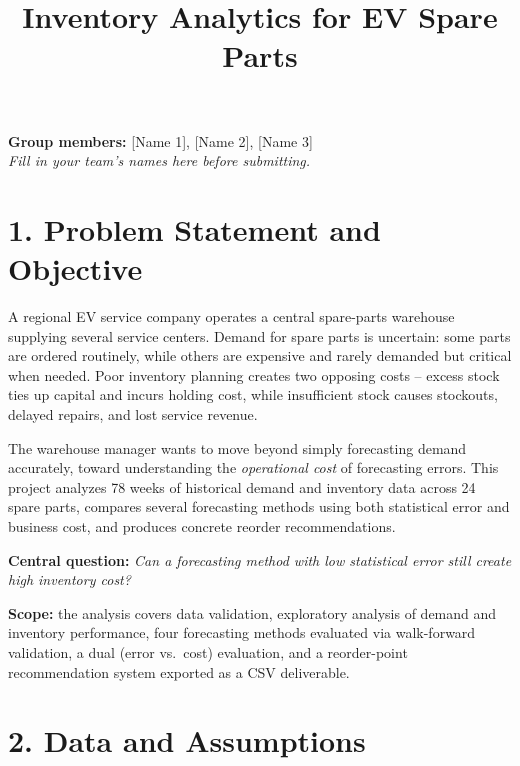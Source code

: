 \documentclass[12pt]{article}
\title{\vspace{-1.5em}Inventory Analytics for EV Spare Parts}
\author{}
\date{}
\begin{document}
\maketitle
\vspace{-2.5em}

\begin{center}
\textbf{Group members:} [Name 1], [Name 2], [Name 3] \\
\textit{Fill in your team's names here before submitting.}
\end{center}

\vspace{0.5em}

\section*{1. Problem Statement and Objective}

A regional EV service company operates a central spare-parts warehouse supplying several
service centers. Demand for spare parts is uncertain: some parts are ordered routinely, while
others are expensive and rarely demanded but critical when needed. Poor inventory planning
creates two opposing costs -- excess stock ties up capital and incurs holding cost, while
insufficient stock causes stockouts, delayed repairs, and lost service revenue.

The warehouse manager wants to move beyond simply forecasting demand accurately, toward
understanding the \emph{operational cost} of forecasting errors. This project analyzes 78
weeks of historical demand and inventory data across 24 spare parts, compares several
forecasting methods using both statistical error and business cost, and produces concrete
reorder recommendations.

\textbf{Central question:} \emph{Can a forecasting method with low statistical error still
create high inventory cost?}

\textbf{Scope:} the analysis covers data validation, exploratory analysis of demand and
inventory performance, four forecasting methods evaluated via walk-forward validation, a dual
(error vs.\ cost) evaluation, and a reorder-point recommendation system exported as a CSV
deliverable.

\section*{2. Data and Assumptions}
\end{document}
